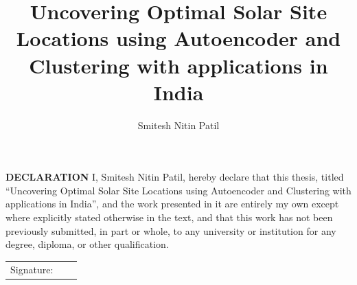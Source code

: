 \documentclass[a4paper,12pt]{Classes/RoboticsLaTeX}
\title{\Large{Uncovering Optimal Solar Site
Locations using Autoencoder and Clustering with applications in India}}
\author{Smitesh Nitin Patil}
\begin{document}
	\begin{spacing}{1}
		\maketitle
	\end{spacing}
	
	
	\setcounter{secnumdepth}{3}
	\setcounter{tocdepth}{3}
	
	\frontmatter
	
	\textbf{DECLARATION} 
	I, Smitesh Nitin Patil, hereby declare that this thesis, titled ``Uncovering Optimal Solar Site
	Locations using Autoencoder and Clustering with applications in India'', and the work presented in it are entirely my own except where explicitly stated otherwise in the text, and that this work has not been previously submitted, in part or whole, to any university or institution for any degree, diploma, or other qualification. 
	\newline
	
	\begin{tabular}{@{}p{.5in}p{4in}@{}}
		Signature: & ~~\hrulefill \\
	\end{tabular}
	
	
	
\end{document}
